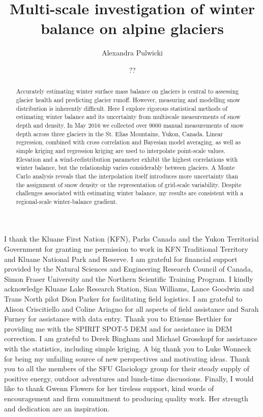 \documentclass{sfuthesis}
\title{Multi-scale investigation of winter balance on alpine glaciers}
\author{Alexandra Pulwicki}
\date{??}
\begin{document}
\frontmatter
\maketitle{}
\makecommittee{}

\begin{abstract}
	Accurately estimating winter surface mass balance on glaciers is central to assessing glacier health and predicting glacier runoff. However, measuring and modelling snow distribution is inherently difficult. Here I explore rigorous statistical methods of estimating winter balance and its uncertainty from multiscale measurements of snow depth and density. In May 2016 we collected over 9000 manual measurements of snow depth across three glaciers in the St. Elias Mountains, Yukon, Canada. Linear regression, combined with cross correlation and Bayesian model averaging, as well as simple kriging and regression kriging are used to interpolate point-scale values. Elevation and a wind-redistribution parameter exhibit the highest correlations with winter balance, but the relationship varies considerably between glaciers. A Monte Carlo analysis reveals that the interpolation itself introduces more uncertainty than the assignment of snow density or the representation of grid-scale variability. Despite challenges associated with estimating winter balance, my results are consistent with a regional-scale winter-balance gradient.
\end{abstract}




\begin{acknowledgements}
I thank the Kluane First Nation (KFN), Parks Canada and the Yukon Territorial Government for granting me permission to work in KFN Traditional Territory and Kluane National Park and Reserve. I am grateful for financial support provided by the Natural Sciences and Engineering Research Council of  Canada, Simon Fraser University and the Northern Scientific  Training Program. I kindly acknowledge Kluane Lake Research Station, Sian Williams, Lance Goodwin and Trans North pilot Dion Parker for facilitating field logistics. I am grateful to Alison Criscitiello and Coline Ariagno for all aspects of field assistance and Sarah Furney for assistance with data entry. Thank you to Etienne Berthier for providing me with the SPIRIT SPOT-5 DEM and for assistance in DEM correction. I am grateful to Derek Bingham and Michael Grosskopf for assistance with the statistics, including simple kriging. A big thank you to Luke Wonneck for being my unfailing source of new perspectives and motivating ideas. Thank you to all the members of the SFU Glaciology group for their steady supply of positive energy, outdoor adventures and lunch-time discussions. Finally, I would like to thank Gwenn Flowers for her tireless support, kind words of encouragement and firm commitment to producing quality work. Her strength and dedication are an inspiration. 
\end{acknowledgements}
\end{document}
